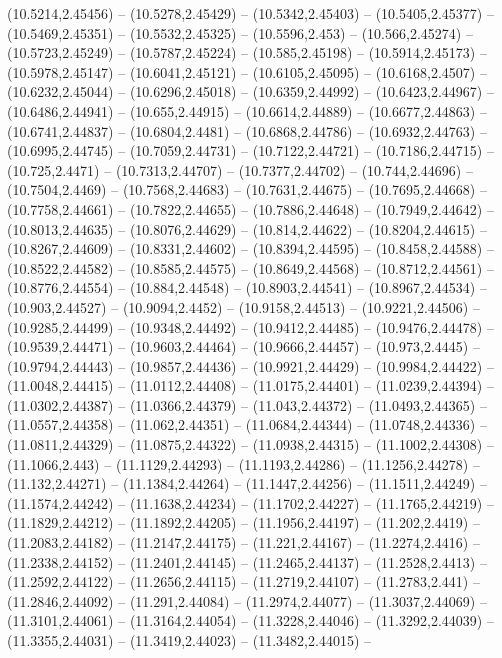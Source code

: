 {(10.5214,2.45456) -- (10.5278,2.45429) -- (10.5342,2.45403) -- (10.5405,2.45377) -- (10.5469,2.45351) -- (10.5532,2.45325) -- (10.5596,2.453) -- (10.566,2.45274) -- (10.5723,2.45249) -- (10.5787,2.45224) -- (10.585,2.45198) -- (10.5914,2.45173) --
(10.5978,2.45147) -- (10.6041,2.45121) -- (10.6105,2.45095) -- (10.6168,2.4507) -- (10.6232,2.45044) -- (10.6296,2.45018) -- (10.6359,2.44992) -- (10.6423,2.44967) -- (10.6486,2.44941) -- (10.655,2.44915) -- (10.6614,2.44889) -- (10.6677,2.44863) --
(10.6741,2.44837) -- (10.6804,2.4481) -- (10.6868,2.44786) -- (10.6932,2.44763) -- (10.6995,2.44745) -- (10.7059,2.44731) -- (10.7122,2.44721) -- (10.7186,2.44715) -- (10.725,2.4471) -- (10.7313,2.44707) -- (10.7377,2.44702) -- (10.744,2.44696) --
(10.7504,2.4469) -- (10.7568,2.44683) -- (10.7631,2.44675) -- (10.7695,2.44668) -- (10.7758,2.44661) -- (10.7822,2.44655) -- (10.7886,2.44648) -- (10.7949,2.44642) -- (10.8013,2.44635) -- (10.8076,2.44629) -- (10.814,2.44622) -- (10.8204,2.44615) --
(10.8267,2.44609) -- (10.8331,2.44602) -- (10.8394,2.44595) -- (10.8458,2.44588) -- (10.8522,2.44582) -- (10.8585,2.44575) -- (10.8649,2.44568) -- (10.8712,2.44561) -- (10.8776,2.44554) -- (10.884,2.44548) -- (10.8903,2.44541) -- (10.8967,2.44534)
-- (10.903,2.44527) -- (10.9094,2.4452) -- (10.9158,2.44513) -- (10.9221,2.44506) -- (10.9285,2.44499) -- (10.9348,2.44492) -- (10.9412,2.44485) -- (10.9476,2.44478) -- (10.9539,2.44471) -- (10.9603,2.44464) -- (10.9666,2.44457) -- (10.973,2.4445)
-- (10.9794,2.44443) -- (10.9857,2.44436) -- (10.9921,2.44429) -- (10.9984,2.44422) -- (11.0048,2.44415) -- (11.0112,2.44408) -- (11.0175,2.44401) -- (11.0239,2.44394) -- (11.0302,2.44387) -- (11.0366,2.44379) -- (11.043,2.44372) --
(11.0493,2.44365) -- (11.0557,2.44358) -- (11.062,2.44351) -- (11.0684,2.44344) -- (11.0748,2.44336) -- (11.0811,2.44329) -- (11.0875,2.44322) -- (11.0938,2.44315) -- (11.1002,2.44308) -- (11.1066,2.443) -- (11.1129,2.44293) -- (11.1193,2.44286) --
(11.1256,2.44278) -- (11.132,2.44271) -- (11.1384,2.44264) -- (11.1447,2.44256) -- (11.1511,2.44249) -- (11.1574,2.44242) -- (11.1638,2.44234) -- (11.1702,2.44227) -- (11.1765,2.44219) -- (11.1829,2.44212) -- (11.1892,2.44205) -- (11.1956,2.44197)
-- (11.202,2.4419) -- (11.2083,2.44182) -- (11.2147,2.44175) -- (11.221,2.44167) -- (11.2274,2.4416) -- (11.2338,2.44152) -- (11.2401,2.44145) -- (11.2465,2.44137) -- (11.2528,2.4413) -- (11.2592,2.44122) -- (11.2656,2.44115) -- (11.2719,2.44107) --
(11.2783,2.441) -- (11.2846,2.44092) -- (11.291,2.44084) -- (11.2974,2.44077) -- (11.3037,2.44069) -- (11.3101,2.44061) -- (11.3164,2.44054) -- (11.3228,2.44046) -- (11.3292,2.44039) -- (11.3355,2.44031) -- (11.3419,2.44023) -- (11.3482,2.44015) --
}
